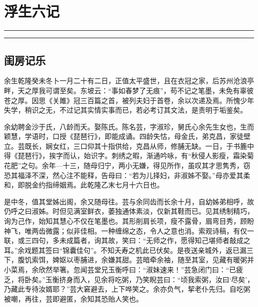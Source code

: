 \documentclass[]{article}
\date{}
\begin{document}
\hypertarget{header-n12}{%
\section{浮生六记}\label{header-n12}}

\begin{center}\rule{0.5\linewidth}{\linethickness}\end{center}

\tableofcontents

\begin{center}\rule{0.5\linewidth}{\linethickness}\end{center}

\hypertarget{header-n18}{%
\subsection{闺房记乐}\label{header-n18}}

余生乾隆癸未冬卜一月二十有二日，正值太平盛世，且在衣冠之家，后苏州沧浪亭畔，天之厚我可谓至矣。东坡云：``事如春梦了无痕''，苟不记之笔墨，未免有辜彼苍之厚。因思《关雎》冠三百篇之首，被列夫妇于首卷，余以次递及焉。所愧少年失学，稍识之无，不过记其实情实事而已，若必考订其文法，是责明于垢鉴矣。

余幼聘金沙于氏，八龄而夭。娶陈氏。陈名芸，字淑珍，舅氏心余先生女也，生而颖慧，学语时，口授《琵琶行》，即能成诵。四龄失怙，母金氏，弟克昌，家徒壁立。芸既长，娴女红，三口仰其十指供给，克昌从师，修脯无缺。一日，于书簏中得《琵琶行》，挨字而认，始识字。刺绣之暇，渐通吟咏，有``秋侵人影瘦，霜染菊花肥''之句。余年---十三，随母归宁，两小无嫌，得见所作，虽叹其才思隽秀，窃恐其福泽不深，然心注不能释，告母曰：``若为儿择妇，非淑姊不娶。''母亦爱其柔和，即脱金约指缔姻焉。此乾隆乙末七月十六日也。

是中冬，值其堂姊出阁，余又随母往。芸与余同齿而长余十月，自幼姊弟相呼，故仍呼之曰淑姊。时但见满室鲜衣，萎独通体素淡，仅新其鞋而已。见其绣制精巧，询为己作，始知其慧心不仅在笔墨也。其形削肩长项，瘦不露骨，眉弯目秀，顾盼神飞，唯两齿微露；似非佳相。一种缠绵之态，令人之意也消。索观诗稿，有仅一联，或三四句，多未成篇者，询其故，笑曰：``无师之作，愿得知己堪师者敲成之耳。''余戏题其签曰``锦囊佳句''。不知夭寿之机此已伏矣。是夜送亲城外，返已漏三下，腹饥索饵，婢妪以枣脯进，余嫌其甜。芸暗牵余袖，随至其室，见藏有暖粥并小菜焉，余欣然举箸。忽闻芸堂兄玉衡呼曰：``淑妹速来！''芸急闭门曰：``已疲乏，将卧矣。''玉衡挤身而入，见余将吃粥，乃笑睨芸曰：``顷我索粥，汝曰`尽矣'，乃藏此专待汝婿耶？''芸大窘避去，上下哗笑之。余亦负气，挈老仆先归。自吃粥被嘲，再往，芸即避匿，余知其恐贻人笑也。
\end{document}
